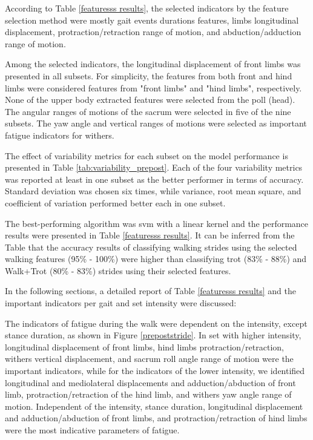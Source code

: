 According to Table \ref{featuresss results}, the selected indicators by the feature selection method were mostly gait events durations features, limbs longitudinal displacement, protraction/retraction range of motion, and abduction/adduction range of motion.

Among the selected indicators, the longitudinal displacement of front limbs was presented in all subsets. For simplicity, the features from both front and hind limbs were considered features from "front limbs" and "hind limbs", respectively. None of the upper body extracted features were selected from the poll (head). The angular ranges of motions of the sacrum were selected in five of the nine subsets. The yaw angle and vertical ranges of motions were selected as important fatigue indicators for withers.

The effect of variability metrics for each subset on the model performance is presented in Table \ref{tab:variability_prepost}. Each of the four variability metrics was reported at least in one subset as the better performer in terms of accuracy. Standard deviation was chosen six times, while variance, root mean square, and coefficient of variation performed better each in one subset.



The best-performing algorithm was \gls{svm} with a linear kernel and the performance results were presented in Table \ref{featuresss results}. It can be inferred from the Table that the accuracy results of classifying walking strides using the selected walking features (95\% - 100\%) were higher than classifying trot (83\% - 88\%) and Walk+Trot (80\% - 83\%) strides using their selected features. 

In the following sections, a detailed report of Table \ref{featuresss results} and the important indicators per gait and \gls{set} intensity were discussed:


The indicators of fatigue during the walk were dependent on the intensity, except stance duration, as shown in Figure \ref{prepoststride}. In \gls{set} with higher intensity, longitudinal displacement of front limbs, hind limbs protraction/retraction, withers vertical displacement, and sacrum roll angle range of motion were the important indicators, while for the indicators of the lower intensity, we identified longitudinal and mediolateral displacements and adduction/abduction of front limb, protraction/retraction of the hind limb, and withers yaw angle range of motion. Independent of the intensity, stance duration, longitudinal displacement and adduction/abduction of front limbs, and protraction/retraction of hind limbs were the most indicative parameters of fatigue. 


